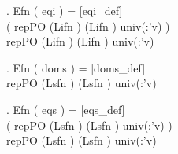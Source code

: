\begin{figure}[t]
\begin{minipage}{1.0\linewidth}
\begin{small}
\HOLTokenTurnstile{} \HOLTokenForall{}    .
     Efn    ( eqi ) = \hfill{[eqi\_def]}\\\hspace*{0.3in}
     ( repPO  (Lifn  ) (Lifn  ) 
        univ(:'v)
        \HOLTokenLeftbrace{}\HOLTokenRightbrace{}) \HOLTokenInter{}\\\hspace*{0.3in}
      repPO  (Lifn  ) (Lifn  )  univ(:'v)  \HOLTokenLeftbrace{}\HOLTokenRightbrace{}

\HOLTokenTurnstile{} \HOLTokenForall{}    .
     Efn    ( doms ) = \hfill{[doms\_def]}\\\hspace*{0.3in}
      repPO  (Lsfn  ) (Lsfn  )  univ(:'v)  \HOLTokenLeftbrace{}\HOLTokenRightbrace{}

\HOLTokenTurnstile{} \HOLTokenForall{}    .
     Efn    ( eqs ) = \hfill{[eqs\_def]}\\\hspace*{0.3in}
     ( repPO  (Lsfn  ) (Lsfn  ) 
        univ(:'v)
        \HOLTokenLeftbrace{}\HOLTokenRightbrace{}) \HOLTokenInter{}\\\hspace*{0.3in}
      repPO  (Lsfn  ) (Lsfn  )  univ(:'v)  \HOLTokenLeftbrace{}\HOLTokenRightbrace{}


\end{small}
\end{minipage}
\end{figure}
